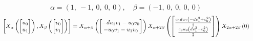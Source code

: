 \documentclass[11pt]{article}
\theoremstyle{definition}
\begin{document}
\[
\alpha = \left( 1, \  -1, \  0, \  0, \  0\right), \quad \beta = \left( -1, \  0, \  0, \  0, \  0\right)
\]
\[
\scaletoalign{\textwidth}{\left[ X_{\alpha}\left(\left[\begin{matrix}u_{0}\\u_{1}\end{matrix}\right]\right), X_{\beta}\left(\left[\begin{matrix}v_{0}\\v_{1}\end{matrix}\right]\right) \right] = X_{\alpha + \beta}\left(\left[\begin{matrix}- d u_{1} v_{1} - u_{0} v_{0}\\- u_{0} v_{1} - u_{1} v_{0}\end{matrix}\right]\right) X_{\alpha + 2\beta}\left(\left[\begin{matrix}\frac{c_{0} d u_{1} \left(- d v_{1}^{2} + v_{0}^{2}\right)}{2}\\\frac{c_{0} u_{0} \left(d v_{1}^{2} - v_{0}^{2}\right)}{2}\end{matrix}\right]\right) X_{2\alpha + 2\beta}\left(0\right)}
\]
\end{document}
